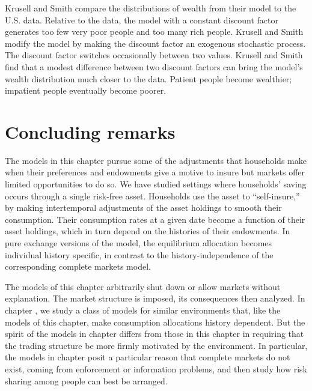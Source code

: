   Krusell and Smith  compare the distributions of wealth
from their model to the U.S. data.  Relative to the data, the model
with a constant discount factor generates too few very poor
people and too many rich people.   Krusell and Smith modify the
model by making the discount factor an exogenous stochastic process.
The discount factor switches occasionally between two values.  Krusell and
Smith find   that a modest difference between two discount factors can
bring the model's wealth distribution much closer to the data.
Patient people become wealthier; impatient people eventually become
poorer.


\section{Concluding remarks}
  The models in this chapter pursue some of the adjustments
that households  make when their preferences and
endowments give a motive to insure but markets offer
limited opportunities to do so.  We have studied
settings where households' saving  occurs through a single
risk-free asset.  Households use the asset to ``self-insure,''
by making intertemporal adjustments of the asset holdings to smooth
their consumption. Their consumption  rates at a given
date become a function of their asset holdings,
which in turn depend on the  histories of their
endowments.   In pure exchange versions of the model,
the equilibrium allocation becomes individual history specific,
in contrast to the history-independence of the corresponding
complete markets model.


  The models of this chapter arbitrarily shut down or allow markets
without explanation.   The market structure is imposed, its consequences
then analyzed.  In chapter , we study a class of  models
for similar environments that, like the models of this chapter,
make consumption allocations history dependent. But
the spirit of the models in chapter  differs from
those in this chapter in requiring that the trading structure
be more firmly motivated by the environment.  In particular,
the models in chapter 
posit a particular   reason that complete markets do not exist,
coming from enforcement or information problems, and then study how
risk sharing among people can best be arranged.


\showchaptIDfalse
\showsectIDfalse
